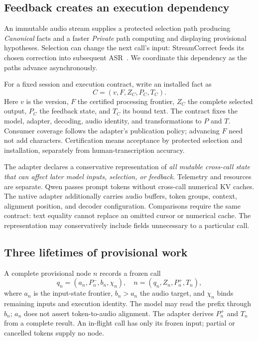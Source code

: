 \subsection{Feedback creates an execution dependency}
An immutable audio stream supplies a protected selection path producing
\emph{Canonical} facts and a faster \emph{Private} path computing and
displaying provisional hypotheses. Selection can change the next call's
input: StreamCorrect feeds its chosen correction into subsequent
ASR~\cite{vu2026streamcorrect}. We coordinate this dependency as the paths
advance asynchronously.

For a fixed session and execution contract, write an installed fact as
\begin{equation}
 C=(v,F,Z_C,P_C,T_C).
 \label{eq:canonical}
\end{equation}
Here $v$ is the version, $F$ the certified processing frontier, $Z_C$ the
complete selected output, $P_C$ the feedback state, and $T_C$ its bound
text. The contract fixes the model, adapter, decoding, audio identity,
and transformations to $P$ and $T$. Consumer coverage follows the adapter's
publication policy; advancing $F$ need not add characters. Certification
means acceptance by protected selection and installation, separately
from human-transcription accuracy.

The adapter declares a conservative representation of \emph{all mutable
cross-call state that can affect later model inputs, selection, or feedback}.
Telemetry and resources are separate. Qwen passes prompt tokens without
cross-call numerical KV caches. The native adapter additionally carries
audio buffers, token groups, context, alignment position, and decoder
configuration. Comparisons require the same contract: text equality
cannot replace an omitted cursor or numerical cache. The representation
may conservatively include fields unnecessary to a particular call.

\subsection{Three lifetimes of provisional work}
A complete provisional node $n$ records a frozen call
\begin{equation}
 q_n=(a_n,P_n^-,b_n,\chi_n),\quad
 n=(q_n,Z_n,P_n^+,T_n),
 \label{eq:node}
\end{equation}
where $a_n$ is the input-state frontier, $b_n>a_n$ the audio target, and
$\chi_n$ binds remaining inputs and execution identity. The model may read
the prefix through $b_n$; $a_n$ does not assert token-to-audio alignment.
The adapter derives $P_n^+$ and $T_n$ from a complete result. An in-flight
call has only its frozen input; partial or cancelled tokens supply no node.

